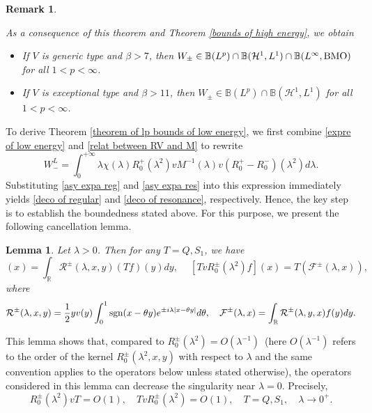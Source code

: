 \documentclass[reqno]{amsart}
\newtheorem{lemma}[definition]{Lemma}
\newtheorem{remark}[definition]{Remark}
\newcommand\R{\mathbb{R}}
\newcommand\B{\mathbb{B}}
\newcommand\mcaF{\mathcal{F}}
\newcommand\HH{\mathcal{H}}
\newcommand\mcaR{\mathcal{R}}
\numberwithin{equation}{section}
\begin{document}
\begin{remark}\label{rem of bounds of Wpm}
{\rm As a consequence of this theorem and Theorem \ref{bounds of high energy}, we obtain 
\begin{itemize}
\item If $V$ is generic type and $\beta>7$, then $W_{\pm}\in\B(L^p)\cap\B(\HH^1,L^1)\cap\B(L^{\infty},{\rm BMO})$ for all $1<p<\infty$.
\vskip0.1cm
\item If $V$ is exceptional type and $\beta>11$, then $W_{\pm}\in\B(L^p)\cap\B(\HH^1,L^1)$ for all $1<p<\infty$.
\end{itemize} 
}
\end{remark}
To derive Theorem \ref{theorem of lp bounds of low energy}, we first combine \eqref{expre of low energy} and \eqref{relat between RV and M} to rewrite  \begin{equation*}
W^{L}_{-}=\int_{0}^{+\infty}\lambda\chi(\lambda)R^{+}_{0}(\lambda^{2})vM^{-1}(\lambda)v(R^+_{0}-R^-_{0})({\lambda}^{2})d\lambda.
\end{equation*} 
Substituting 
\eqref{asy expa reg} and \eqref{asy expa res} into this expression immediately yields \eqref{deco of regular} and \eqref{deco of resonance}, respectively. Hence, the key step is to establish the boundedness stated above. For this purpose, we present the following cancellation lemma.
\begin{lemma}\label{cancel lemma}
Let $\lambda>0$. Then for any $T=Q,S_1$, we have
\begin{equation*}
 [R^{\pm}_0(\lambda^2)vTf](x)=\int_{\R}\mcaR^{\pm}(\lambda,x,y)(Tf)(y)dy,\quad\ [TvR^{\pm}_0(\lambda^2)f](x)=T(\mcaF^{\pm}(\lambda,x)),
\end{equation*}
where 
\begin{equation*}
\mcaR^{\pm}(\lambda,x,y)=\frac{1}{2}yv(y)\int_{0}^{1}{\rm sgn}(x-\theta y)e^{\pm i \lambda|x-\theta y|}d\theta,\quad \mcaF^{\pm}(\lambda,x)=\int_{\R}\mcaR^{\pm}(\lambda,y,x)f(y)dy.
\end{equation*}
\end{lemma}
 This lemma shows that, compared to $R^{\pm}_0(\lambda^2)=O(\lambda^{-1})$~(here $O(\lambda^{-1})$ refers to the order of the kernel $R^{\pm}_{0}(\lambda^2,x,y)$ with respect to $\lambda$ and the same convention applies to the operators below unless stated otherwise), the operators considered in this lemma can decrease the singularity near $\lambda=0$. Precisely, 
$$ R^{\pm}_{0}(\lambda^{2})vT=O(1),\quad TvR^{\pm}_{0}(\lambda^{2})=O(1),\quad  T=Q,S_1,\quad\lambda\rightarrow 0^{+}.$$
\end{document}
